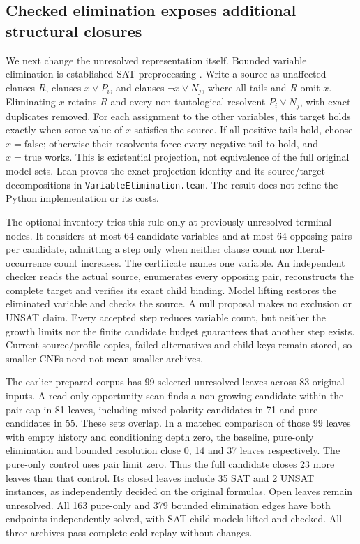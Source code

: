 \documentclass[11pt,a4paper]{article}
\numberwithin{equation}{section}
\theoremstyle{plain}
\theoremstyle{definition}
\theoremstyle{remark}
\begin{document}
\subsection{Checked elimination exposes additional structural closures}
\label{sec:variable-elimination}

We next change the unresolved representation itself. Bounded variable elimination is established SAT preprocessing \citep{eenbiere2005}. Write a source as unaffected clauses $R$, clauses $x\lor P_i$, and clauses $\neg x\lor N_j$, where all tails and $R$ omit $x$. Eliminating $x$ retains $R$ and every non-tautological resolvent $P_i\lor N_j$, with exact duplicates removed. For each assignment to the other variables, this target holds exactly when some value of $x$ satisfies the source. If all positive tails hold, choose $x=\mathrm{false}$; otherwise their resolvents force every negative tail to hold, and $x=\mathrm{true}$ works. This is existential projection, not equivalence of the full original model sets. Lean proves the exact projection identity and its source/target decompositions in \texttt{VariableElimination.lean}. The result does not refine the Python implementation or its costs.

The optional inventory tries this rule only at previously unresolved terminal nodes. It considers at most 64 candidate variables and at most 64 opposing pairs per candidate, admitting a step only when neither clause count nor literal-occurrence count increases. The certificate names one variable. An independent checker reads the actual source, enumerates every opposing pair, reconstructs the complete target and verifies its exact child binding. Model lifting restores the eliminated variable and checks the source. A null proposal makes no exclusion or UNSAT claim. Every accepted step reduces variable count, but neither the growth limits nor the finite candidate budget guarantees that another step exists. Current source/profile copies, failed alternatives and child keys remain stored, so smaller CNFs need not mean smaller archives.

The earlier prepared corpus has 99 selected unresolved leaves across 83 original inputs. A read-only opportunity scan finds a non-growing candidate within the pair cap in 81 leaves, including mixed-polarity candidates in 71 and pure candidates in 55. These sets overlap. In a matched comparison of those 99 leaves with empty history and conditioning depth zero, the baseline, pure-only elimination and bounded resolution close 0, 14 and 37 leaves respectively. The pure-only control uses pair limit zero. Thus the full candidate closes 23 more leaves than that control. Its closed leaves include 35 SAT and 2 UNSAT instances, as independently decided on the original formulas. Open leaves remain unresolved. All 163 pure-only and 379 bounded elimination edges have both endpoints independently solved, with SAT child models lifted and checked. All three archives pass complete cold replay without changes.
\end{document}
